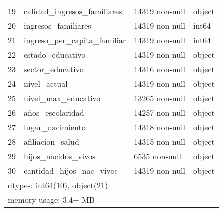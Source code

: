 \documentclass[a4paper]{article}
\begin{document}
\begin{table}[H]
\begin{center}
\begin{tabular}{clll}
    19 & calidad\_ingresos\_familiares & 14319 non-null & object \\
    20 & ingresos\_familiares         & 14319 non-null & int64  \\
    21 & ingreso\_per\_capita\_familiar & 14319 non-null & int64  \\
    22 & estado\_educativo            & 14319 non-null & object \\
    23 & sector\_educativo            & 14316 non-null & object \\
    24 & nivel\_actual                & 14319 non-null & object \\
    25 & nivel\_max\_educativo         & 13265 non-null & object \\
    26 & años\_escolaridad            & 14257 non-null & object \\
    27 & lugar\_nacimiento            & 14318 non-null & object \\
    28 & afiliacion\_salud            & 14315 non-null & object \\
    29 & hijos\_nacidos\_vivos         & 6535 non-null  & object \\
    30 & cantidad\_hijos\_nac\_vivos    & 14319 non-null & object \\
    \multicolumn{4}{l}{dtypes: int64(10), object(21)}  \\
    \multicolumn{4}{l}{memory usage: 3.4+ MB} \\
    \end{tabular}\end{center}
    \end{table}
       
\end{document}
